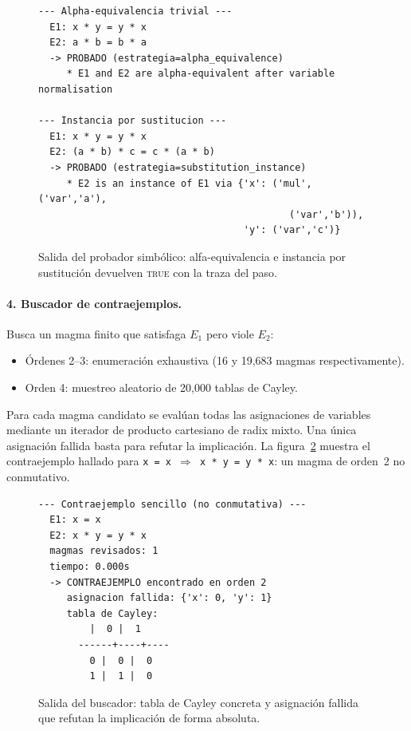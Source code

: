 \documentclass{article}
\begin{document}
\begin{figure}[h]
\centering
\begin{minipage}{0.95\linewidth}
\begin{verbatim}
--- Alpha-equivalencia trivial ---
  E1: x * y = y * x
  E2: a * b = b * a
  -> PROBADO (estrategia=alpha_equivalence)
     * E1 and E2 are alpha-equivalent after variable normalisation

--- Instancia por sustitucion ---
  E1: x * y = y * x
  E2: (a * b) * c = c * (a * b)
  -> PROBADO (estrategia=substitution_instance)
     * E2 is an instance of E1 via {'x': ('mul', ('var','a'),
                                            ('var','b')),
                                    'y': ('var','c')}
\end{verbatim}
\end{minipage}
\caption{Salida del probador simb\'olico: alfa-equivalencia e instancia por sustituci\'on devuelven \textsc{true} con la traza del paso.}
\label{fig:demo-prover}
\end{figure}

\paragraph{4. Buscador de contraejemplos.} Busca un magma finito que satisfaga $E_1$ pero viole $E_2$:
\begin{itemize}[itemsep=1pt]
  \item \'Ordenes 2--3: enumeraci\'on exhaustiva (16 y 19{,}683 magmas respectivamente).
  \item Orden 4: muestreo aleatorio de 20{,}000 tablas de Cayley.
\end{itemize}
Para cada magma candidato se eval\'uan todas las asignaciones de variables mediante un iterador de producto cartesiano de radix mixto. Una \'unica asignaci\'on fallida basta para refutar la implicaci\'on. La figura~\ref{fig:demo-counter} muestra el contraejemplo hallado para \texttt{x = x $\Rightarrow$ x * y = y * x}: un magma de orden~2 no conmutativo.

\begin{figure}[h]
\centering
\begin{minipage}{0.95\linewidth}
\begin{verbatim}
--- Contraejemplo sencillo (no conmutativa) ---
  E1: x = x
  E2: x * y = y * x
  magmas revisados: 1
  tiempo: 0.000s
  -> CONTRAEJEMPLO encontrado en orden 2
     asignacion fallida: {'x': 0, 'y': 1}
     tabla de Cayley:
         |  0 |  1
       ------+----+----
         0 |  0 |  0
         1 |  1 |  0
\end{verbatim}
\end{minipage}
\caption{Salida del buscador: tabla de Cayley concreta y asignaci\'on fallida que refutan la implicaci\'on de forma absoluta.}
\label{fig:demo-counter}
\end{figure}
\end{document}
